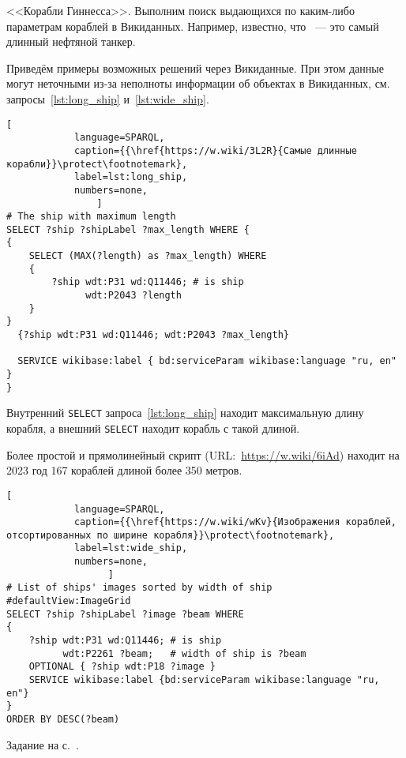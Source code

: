 \hfil{}\hfil%
\newpage

\begin{task}
\label{answer:ship_Guinness}
<<Корабли Гиннесса>>. 
    Выполним поиск выдающихся по каким-либо параметрам кораблей в Викиданных.
    Например, известно, что ~--- это самый длинный нефтяной танкер.

Приведём примеры возможных решений через Викиданные. 
При этом данные могут неточными из-за неполноты информации об объектах в Викиданных, 
    см. запросы~\ref{lst:long_ship} и~\ref{lst:wide_ship}.

\begin{lstlisting}[ 
            language=SPARQL, 
            caption={{\href{https://w.wiki/3L2R}{Самые длинные корабли}}\protect\footnotemark}, 
            label=lst:long_ship,
            numbers=none,
                ]
# The ship with maximum length
SELECT ?ship ?shipLabel ?max_length WHERE {
{
    SELECT (MAX(?length) as ?max_length) WHERE
    {
        ?ship wdt:P31 wd:Q11446; # is ship
              wdt:P2043 ?length
    }
}
  {?ship wdt:P31 wd:Q11446; wdt:P2043 ?max_length}
		
  SERVICE wikibase:label { bd:serviceParam wikibase:language "ru, en" }
}
\end{lstlisting}

Внутренний \lstinline|SELECT| запроса~\ref{lst:long_ship} находит максимальную длину корабля, 
а внешний \lstinline|SELECT| находит корабль с такой длиной. 

Более простой и прямолинейный скрипт (URL:~\href{https://w.wiki/6iAd}{https://w.wiki/6iAd}) 
находит на 2023 год 167 кораблей длиной более 350 метров. 




\newpage
\begin{lstlisting}[ 
            language=SPARQL, 
            caption={{\href{https://w.wiki/wKv}{Изображения кораблей, отсортированных по ширине корабля}}\protect\footnotemark}, 
            label=lst:wide_ship, 
            numbers=none,
                  ]
# List of ships' images sorted by width of ship
#defaultView:ImageGrid
SELECT ?ship ?shipLabel ?image ?beam WHERE 
{
    ?ship wdt:P31 wd:Q11446; # is ship
          wdt:P2261 ?beam;   # width of ship is ?beam
    OPTIONAL { ?ship wdt:P18 ?image }
    SERVICE wikibase:label {bd:serviceParam wikibase:language "ru, en"}
}
ORDER BY DESC(?beam)
\end{lstlisting}

\small{Задание на с.~\pageref{question:ship_Guinness}.}
\end{task}




